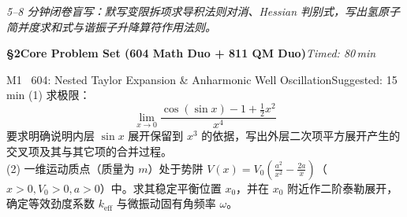 \documentclass[a4paper,11pt]{article}
\begin{document}
\vspace{4pt}

\begin{tcolorbox}[
  enhanced, colback=white, colframe=border, boxrule=0.6pt, arc=2mm,
  left=4mm, right=4mm, top=3mm, bottom=3mm,
  fonttitle=\sffamily\bfseries\color{slate},
  title={\raisebox{0pt}{\color{royal}\rule{3pt}{10pt}}\hspace{4pt}Warm-Up Retrieval Workspace \textbar\ 白纸破冰与间隔提取草稿区},
  colbacktitle=paper, coltitle=slate,
  titlerule=0pt, toptitle=2mm, bottomtitle=2mm
]
\textcolor{mist}{\footnotesize\itshape 5--8 分钟闭卷盲写：默写变限拆项求导积法则对消、Hessian 判别式，写出氢原子简并度求和式与谐振子升降算符作用法则。}
\vspace{9.0cm}
\end{tcolorbox}

\clearpage

{\Large\sffamily\bfseries\color{navy} \S 2\quad Core Problem Set (604 Math Duo + 811 QM Duo)}\hfill{\small\sffamily\color{mist}\itshape Timed: 80\,min}

\vspace{3pt}

\begin{problem}{M1 \textbar\ 604: Nested Taylor Expansion \& Anharmonic Well Oscillation}{Suggested: 15\,min}
(1) 求极限：
\[
  \lim_{x \to 0} \frac{\cos(\sin x) - 1 + \frac{1}{2}x^2}{x^4}
\]
要求明确说明内层 $\sin x$ 展开保留到 $x^3$ 的依据，写出外层二次项平方展开产生的交叉项及其与其它项的合并过程。\\
(2) 一维运动质点（质量为 $m$）处于势阱 $V(x) = V_0 \left(\frac{a^2}{x^2} - \frac{2a}{x}\right)$（$x>0, V_0>0, a>0$）中。求其稳定平衡位置 $x_0$，并在 $x_0$ 附近作二阶泰勒展开，确定等效劲度系数 $k_{\text{eff}}$ 与微振动固有角频率 $\omega$。
\end{problem}

\vspace{2pt}
\end{document}
